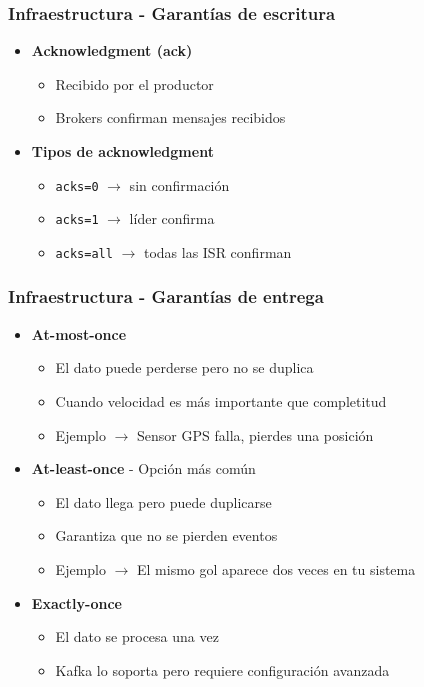 \documentclass[aspectratio=169]{beamer}
\begin{document}
\begin{frame}\frametitle{Infraestructura - Garantías de escritura}
\begin{itemize}
  \item \textbf{Acknowledgment (ack)}
  \begin{itemize}
    \item Recibido por el productor
    \item Brokers confirman mensajes recibidos
  \end{itemize}

  \vspace{1em}

  \item \textbf{Tipos de acknowledgment}
  \begin{itemize}
    \item \texttt{acks=0} $\rightarrow$ sin confirmación
    \item \texttt{acks=1} $\rightarrow$ líder confirma
    \item \texttt{acks=all} $\rightarrow$ todas las ISR confirman
  \end{itemize}
\end{itemize}
\end{frame}

\begin{frame}\frametitle{Infraestructura - Garantías de entrega}
\begin{itemize}
  \item \textbf{At-most-once}
  \begin{itemize}
    \item El dato puede perderse pero no se duplica
    \item Cuando velocidad es más importante que completitud
    \item Ejemplo $\rightarrow$ Sensor GPS falla, pierdes una posición
  \end{itemize}

  \vspace{1em}

  \item \textbf{At-least-once} - Opción más común
  \begin{itemize}
    \item El dato llega pero puede duplicarse
    \item Garantiza que no se pierden eventos
    \item Ejemplo $\rightarrow$ El mismo gol aparece dos veces en tu sistema

  \end{itemize}

  \vspace{1em}

  \item \textbf{Exactly-once}
  \begin{itemize}
    \item El dato se procesa una vez
    \item Kafka lo soporta pero requiere configuración avanzada
  \end{itemize}
\end{itemize}
\end{frame}
\end{document}
